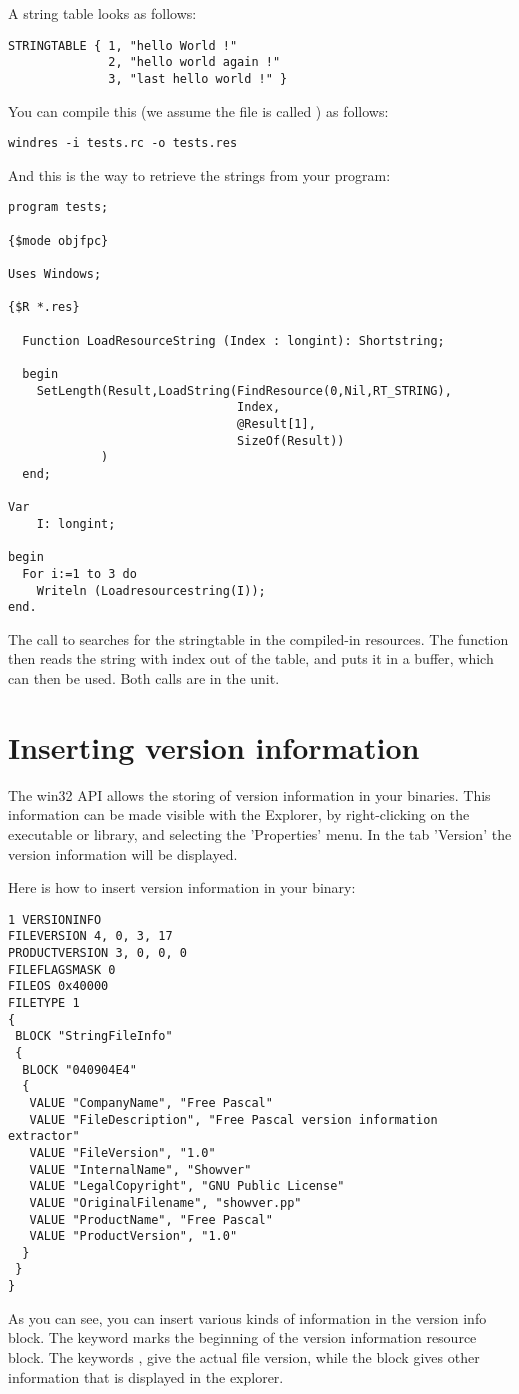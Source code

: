 A string table looks as follows:
\begin{verbatim}
STRINGTABLE { 1, "hello World !"
              2, "hello world again !"
              3, "last hello world !" }
\end{verbatim}
You can compile this (we assume the file is called ) as
follows:
\begin{verbatim}
windres -i tests.rc -o tests.res
\end{verbatim}
And this is the way to retrieve the strings from your program:
\begin{verbatim}
program tests;

{$mode objfpc}

Uses Windows;

{$R *.res}

  Function LoadResourceString (Index : longint): Shortstring;

  begin
    SetLength(Result,LoadString(FindResource(0,Nil,RT_STRING),
                                Index,
                                @Result[1],
                                SizeOf(Result))
             )
  end;

Var
    I: longint;

begin
  For i:=1 to 3 do
    Writeln (Loadresourcestring(I));
end.
\end{verbatim}
The call to  searches for the stringtable in the
compiled-in resources. The  function then reads the
string with index  out of the table, and puts it in a buffer,
which can then be used. Both calls are in the  unit.

\section{Inserting version information}

The win32 API allows the storing of version information in your binaries.
This information can be made visible with the \windows Explorer, by
right-clicking on the executable or library, and selecting the
'Properties' menu. In the tab 'Version' the version information will
be displayed.

Here is how to insert version information in your binary:
\begin{verbatim}
1 VERSIONINFO
FILEVERSION 4, 0, 3, 17
PRODUCTVERSION 3, 0, 0, 0
FILEFLAGSMASK 0
FILEOS 0x40000
FILETYPE 1
{
 BLOCK "StringFileInfo"
 {
  BLOCK "040904E4"
  {
   VALUE "CompanyName", "Free Pascal"
   VALUE "FileDescription", "Free Pascal version information extractor"
   VALUE "FileVersion", "1.0"
   VALUE "InternalName", "Showver"
   VALUE "LegalCopyright", "GNU Public License"
   VALUE "OriginalFilename", "showver.pp"
   VALUE "ProductName", "Free Pascal"
   VALUE "ProductVersion", "1.0"
  }
 }
}
\end{verbatim}
As you can see, you can insert various kinds of information in the version info
block. The keyword  marks the beginning of the version
information resource block. The keywords ,
 give the actual file version, while the block
 gives other information that is displayed in the
explorer.

